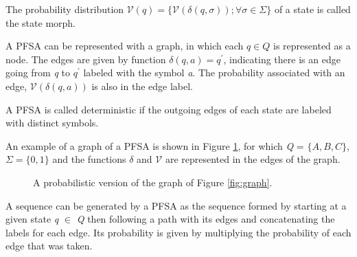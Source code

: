 {\begin{definition}\label{definition:morph}
The probability distribution $\mathcal{V}(q) = \{ \mathcal{V}(\delta(q, \sigma)); \forall \sigma \in \Sigma\}$ of a state is called the state morph.  
\end{definition}

A PFSA can be represented with a graph, in which each $q \in Q$ is represented as a node. The edges are given by function $\delta(q, a) =  q^{\prime}$, indicating there is an edge going from \textit{q} to \textit{$q^{\prime}$} labeled with the symbol \textit{a}. The probability associated with an edge, $\mathcal{V}(\delta(q,a))$ is also in the edge label.

\begin{definition}\label{definition:dpfsa}
A PFSA is called deterministic if the outgoing edges of each state are labeled with distinct symbols. 
\end{definition}

An example of a graph of a PFSA is shown in Figure \ref{fig:pfsa}, for which \textit{Q} = $\{A, B, C\}$, $\Sigma = \{0, 1\}$ and the functions $\delta$ and $\mathcal{V}$ are represented in the edges of the graph.

\begin{figure}
\centering
{}
\caption{A probabilistic version of the graph of Figure \ref{fig:graph}.\label{fig:pfsa}}
\end{figure}

A sequence can be generated by a PFSA as the sequence formed by starting at a given state \textit{q} $\in$ \textit{Q} then following a path with its edges and concatenating the labels for each edge. Its probability is given by multiplying the probability of each edge that was taken.

}
